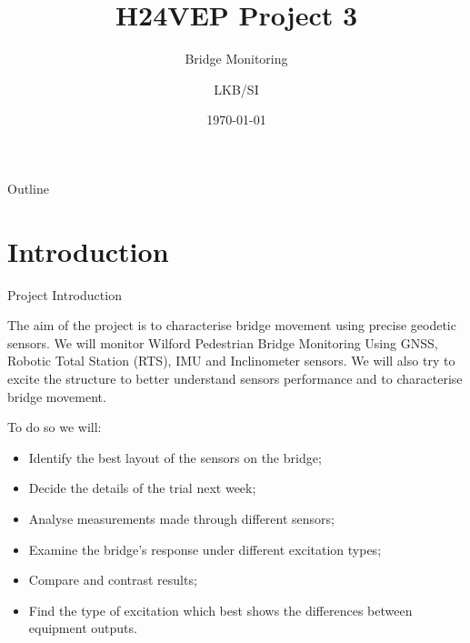 \documentclass[11pt]{beamer}
\title[H24VEP]{H24VEP Project 3}
\subtitle{Bridge Monitoring}
\author{LKB/SI}
\institute{NGI}
\date{\today}
\begin{document}
	
	\begin{frame}
		\titlepage
	\end{frame}
	
	\begin{frame}{Outline}
		\tableofcontents
	\end{frame}
	
\section{Introduction}

\begin{frame}[allowframebreaks]{Project Introduction}

The aim of the project is to characterise bridge movement using precise geodetic sensors. We will monitor Wilford Pedestrian Bridge Monitoring Using GNSS, Robotic Total Station (RTS), IMU and Inclinometer sensors. We will also try to excite the structure to better understand sensors performance and to characterise bridge movement.

To do so we will:

\begin{itemize}
	\item Identify the best layout of the sensors on the bridge;
	\item Decide the details of the trial next week;
	\item Analyse measurements made through different sensors;
	\item Examine the bridge's response under different excitation types;
	\item Compare and contrast results;
	\item Find the type of excitation which best shows the differences between equipment outputs.
\end{itemize}
\end{frame}
\end{document}
